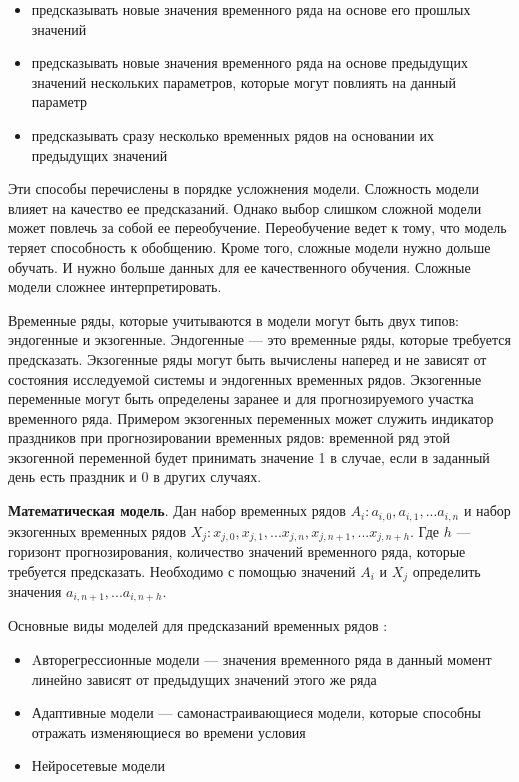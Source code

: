 \begin{itemize}
	\item предсказывать новые значения временного ряда на основе его прошлых значений
	\item предсказывать новые значения временного ряда на основе предыдущих значений
	нескольких параметров, которые могут повлиять на данный параметр
	\item предсказывать сразу несколько временных рядов на основании их предыдущих значений
\end{itemize}

Эти способы перечислены в порядке усложнения модели. Сложность модели влияет на
качество ее предсказаний. Однако выбор слишком сложной модели может повлечь
за собой ее переобучение. Переобучение ведет к тому, что модель теряет способность
к обобщению. Кроме того, сложные модели нужно дольше обучать. И нужно больше данных
для ее качественного обучения. Сложные модели сложнее интерпретировать.

Временные ряды, которые учитываются в модели могут быть двух типов:
эндогенные и экзогенные. Эндогенные --- это временные ряды,
которые требуется предсказать. Экзогенные ряды могут быть вычислены
наперед и не зависят от состояния исследуемой системы и эндогенных временных рядов.
Экзогенные переменные могут быть определены заранее и для прогнозируемого участка временного ряда.
Примером экзогенных переменных может служить
индикатор праздников при прогнозировании временных рядов: временной ряд этой экзогенной переменной
будет принимать значение 1 в случае, если в заданный день есть праздник и 0 в других случаях.

\textbf{Математическая модель}. Дан набор временных рядов $ A_i: a_{i,0}, a_{i,1}, ... a_{i,n} $
и набор экзогенных временных рядов $ X_j: x_{j,0}, x_{j,1}, ... x_{j,n},  x_{j,n+1}, ...  x_{j,n+h} $.
Где $h$ --- горизонт прогнозирования, количество значений временного ряда, которые требуется предсказать.
Необходимо с помощью значений $ A_i $ и $ X_j $ определить значения $ a_{i,n+1}, ... a_{i,n+h} $.

Основные виды моделей для предсказаний временных рядов \cite{voron}:
\begin{itemize}
	\item Aвторегрессионные модели --- значения временного ряда в данный момент
	линейно зависят от предыдущих значений этого же ряда
	\item Адаптивные модели --- самонастраивающиеся модели,
	которые способны отражать изменяющиеся во времени условия
	\item Нейросетевые модели
\end{itemize}

